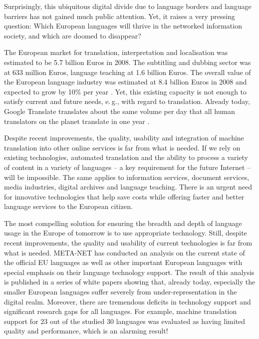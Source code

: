 \documentclass[10pt, plain]{../../metanetpaper}
\begin{document}
\begin{multicols}{2}
Surprisingly, this ubiquitous digital divide due to language borders and language barriers has not gained much public attention. Yet, it raises a very pressing question: Which European languages will thrive in the networked information society, and which are doomed to disappear?

The European market for translation, interpretation and localisation was estimated to be 5.7 billion Euros in 2008. The subtitling and dubbing sector was at 633 million Euros, language teaching at 1.6 billion Euros. The overall value of the European language industry was estimated at 8.4 billion Euros in 2008 and expected to grow by 10\% per year \cite{EC3}. Yet, this existing capacity is not enough to satisfy current and future needs, e.\,g., with regard to translation. Already today, Google Translate translates about the same volume per day that all human translators on the planet translate in one year \cite{och12}.

Despite recent improvements, the quality, usability and integration of machine translation into other online services is far from what is needed. If we rely on existing technologies, automated translation and the ability to process a variety of content in a variety of languages -- a key requirement for the future Internet -- will be impossible. The same applies to information services, document services, media industries, digital archives and language teaching. There is an urgent need for innovative technologies that help save costs while offering faster and better language services to the European citizen.

The most compelling solution for ensuring the breadth and depth of language usage in the Europe of tomorrow is to use appropriate technology. Still, despite recent improvements, the quality and usability of current technologies is far from what is needed. META-NET has conducted an analysis on the current state of the official EU languages as well as other important European languages with special emphasis on their language technology support. The result of this analysis is published in a series of white papers \cite{LWP2012} showing that, already today, especially the smaller European languages suffer severely from under-representation in the digital realm. Moreover, there are tremendous deficits in technology support and significant research gaps for all languages. For example, machine translation support for 23 out of the studied 30 languages was evaluated as having limited quality and performance, which is an alarming result! 


\end{multicols}
\end{document}

